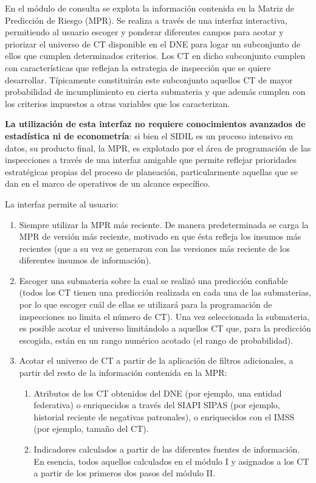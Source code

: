 \documentclass[
]{article}
\begin{document}
En el módulo de consulta se explota la información contenida en la Matriz de Predicción de Riesgo (MPR). Se realiza a través de una interfaz interactiva, permitiendo al usuario escoger y ponderar diferentes campos para acotar y priorizar el universo de CT disponible en el DNE para logar un subconjunto de ellos que cumplen determinados criterios. Los CT en dicho subconjunto cumplen con características que reflejan la estrategia de inspección que se quiere desarrollar. Típicamente constituirán este subconjunto aquellos CT de mayor probabilidad de incumplimiento en cierta submateria y que además cumplen con los criterios impuestos a otras variables que los caracterizan.

\textbf{La utilización de esta interfaz no requiere conocimientos avanzados de estadística ni de econometría}: si bien el SIDIL es un proceso intensivo en datos, su producto final, la MPR, es explotado por el área de programación de las inspecciones a través de una interfaz amigable que permite reflejar prioridades estratégicas propias del proceso de planeación, particularmente aquellas que se dan en el marco de operativos de un alcance específico.

La interfaz permite al usuario:

\begin{enumerate}
\def\labelenumi{\arabic{enumi})}
\item
  Siempre utilizar la MPR más reciente. De manera predeterminada se carga la MPR de versión más reciente, motivado en que ésta refleja los insumos más recientes (que a su vez se generaron con las versiones más reciente de los diferentes insumos de información).
\item
  Escoger una submateria sobre la cual se realizó una predicción confiable (todos los CT tienen una predicción realizada en cada una de las submaterias, por lo que escoger cuál de ellas se utilizará para la programación de inspecciones no limita el número de CT). Una vez seleccionada la submateria, es posible acotar el universo limitándolo a aquellos CT que, para la predicción escogida, están en un rango numérico acotado (el rango de probabilidad).
\item
  Acotar el universo de CT a partir de la aplicación de filtros adicionales, a partir del resto de la información contenida en la MPR:

  \begin{enumerate}
  \def\labelenumii{\alph{enumii}.}
  \item
    Atributos de los CT obtenidos del DNE (por ejemplo, una entidad federativa) o enriquecidos a través del SIAPI SIPAS (por ejemplo, historial reciente de negativas patronales), o enriquecidos con el IMSS (por ejemplo, tamaño del CT).
  \item
    Indicadores calculados a partir de las diferentes fuentes de información. En esencia, todos aquellos calculados en el módulo I y asignados a los CT a partir de los primeros dos pasos del módulo II.
  \end{enumerate}
\end{enumerate}
\end{document}
